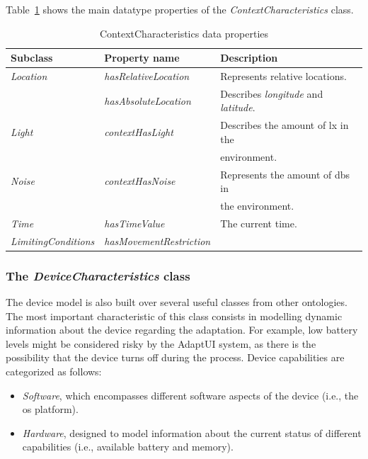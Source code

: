 Table~\ref{tbl:context_characteristics_ontology} shows the main datatype properties
of the \textit{ContextCharacteristics} class.

\begin{table}[H]
  \caption{ContextCharacteristics data properties}
 \label{tbl:context_characteristics_ontology}
\footnotesize
\centering
 \begin{tabular}{l l l}
  \hline 
  \textbf{Subclass} 	& \textbf{Property name} 	& \textbf{Description}					\\
  \hline
  \textit{Location}	& \textit{hasRelativeLocation}	& Represents relative locations.			\\
			& \textit{hasAbsoluteLocation}	& Describes \textit{longitude} and \textit{latitude}.	\\
  \textit{Light}	& \textit{contextHasLight}	& Describes the amount of \ac{lx} in the		\\
			& 				& environment.						\\
  \textit{Noise}	& \textit{contextHasNoise}	& Represents the amount of \acp{db} in 		\\
			& 				& the environment.					\\
  \textit{Time}		& \textit{hasTimeValue}		& The current time.					\\
  \textit{LimitingConditions}& \textit{hasMovementRestriction}&							\\
  \hline
  
\end{tabular}
\end{table}



\subsubsection{The \textit{DeviceCharacteristics} class}
\label{sec:device_characteristics_class}

The device model is also built over several useful classes from other ontologies.
The most important characteristic of this class consists in modelling dynamic
information about the device regarding the adaptation. For example, low battery
levels might be considered risky by the AdaptUI system, as there is the possibility
that the device turns off during the process. Device capabilities are categorized
as follows:

\begin{itemize}
 \item \textit{Software}, which encompasses different software aspects of the
 device (i.e., the \ac{os} platform). 
 
 \item \textit{Hardware}, designed to model information about the current status
 of different capabilities (i.e., available battery and memory).
\end{itemize}


